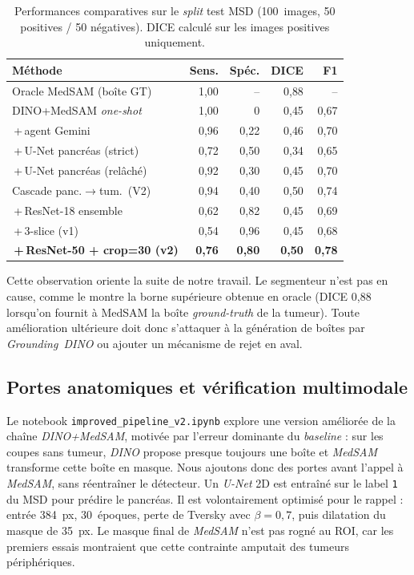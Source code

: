 \documentclass{article}
\begin{document}
\begin{table}[t]
\centering
\small
\setlength{\tabcolsep}{4pt}
\begin{tabular}{lrrrr}
\toprule
M\'ethode & Sens. & Sp\'ec. & DICE & F1 \\
\midrule
Oracle MedSAM (bo\^ite GT)              & 1{,}00 & --     & 0{,}88 & --     \\
DINO+MedSAM \emph{one-shot}             & 1,00 & 0 & 0{,}45 & 0{,}67 \\
\,+\,agent Gemini                       & 0{,}96 & 0{,}22 & 0{,}46 & 0{,}70 \\
\,+\,U-Net pancr\'eas (strict)          & 0{,}72 & 0{,}50 & 0{,}34 & 0{,}65 \\
\,+\,U-Net pancr\'eas (rel\^ach\'e)     & 0{,}92 & 0{,}30 & 0{,}45 & 0{,}70 \\
Cascade panc.$\rightarrow$tum.\ (V2)    & 0{,}94 & 0{,}40 & 0{,}50 & 0{,}74 \\
\,+\,ResNet-18 ensemble                 & 0{,}62 & 0{,}82 & 0{,}45 & 0{,}69 \\
\,+\,3-slice (v1)                       & 0{,}54 & 0{,}96 & 0{,}45 & 0{,}68 \\
\textbf{\,+\,ResNet-50 + crop=30 (v2)}  & \textbf{0{,}76} & \textbf{0{,}80} & \textbf{0{,}50} & \textbf{0{,}78} \\
\bottomrule
\end{tabular}
\caption{Performances comparatives sur le \emph{split} test MSD
(100~images, 50 positives / 50 n\'egatives). DICE calcul\'e sur les images
positives uniquement.}
\label{tab:abl}
\end{table}

Cette observation oriente la suite de notre travail. Le segmenteur n'est
pas en cause, comme le montre la borne sup\'erieure obtenue en oracle (DICE
0{,}88 lorsqu'on fournit \`a MedSAM la bo\^ite \emph{ground-truth} de la
tumeur). Toute am\'elioration ult\'erieure doit donc s'attaquer \`a la
g\'en\'eration de bo\^ites par \emph{Grounding~DINO} ou ajouter un m\'ecanisme
de rejet en aval.

\subsection{Portes anatomiques et v\'erification multimodale}\label{sec:agent}

Le notebook \texttt{improved\_pipeline\_v2.ipynb} explore une version
am\'elior\'ee de la cha\^ine \emph{DINO+MedSAM}, motiv\'ee par l'erreur
dominante du \emph{baseline} : sur les coupes sans tumeur, \emph{DINO}
propose presque toujours une bo\^ite et \emph{MedSAM} transforme cette
bo\^ite en masque. Nous ajoutons donc des portes avant l'appel \`a
\emph{MedSAM}, sans r\'eentra\^iner le d\'etecteur. Un \emph{U-Net} 2D est
entra\^in\'e sur le label \texttt{1} du MSD pour pr\'edire le pancr\'eas. Il
est volontairement optimis\'e pour le rappel : entr\'ee 384~px, 30~\'epoques,
perte de Tversky avec $\beta=0{,}7$, puis dilatation du masque de 35~px. Le
masque final de \emph{MedSAM} n'est pas rogn\'e au ROI, car les premiers
essais montraient que cette contrainte amputait des tumeurs p\'eriph\'eriques.
\end{document}
